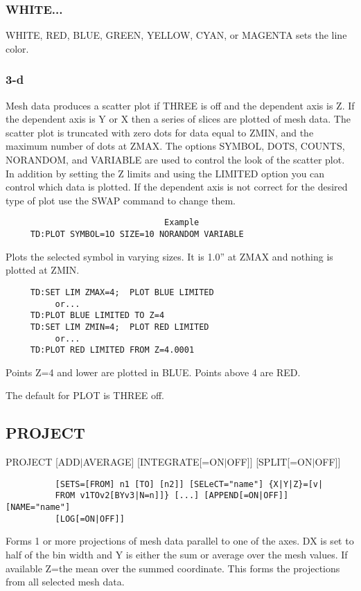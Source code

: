 \subsubsection{WHITE...}
WHITE, RED, BLUE, GREEN, YELLOW, CYAN, or MAGENTA sets the line color. 
\subsubsection{3-d}
Mesh  data  produces  a  scatter plot if THREE is off and the dependent
axis is Z.  If the dependent axis is Y or X then a series of slices are
plotted of mesh data.  The scatter plot is truncated with zero dots for
data equal to ZMIN, and the  maximum  number  of  dots  at  ZMAX.   The
options  SYMBOL,  DOTS,  COUNTS,  NORANDOM,  and  VARIABLE  are used to
control the look of the scatter plot.  In addition  by  setting  the  Z
limits  and  using  the  LIMITED  option  you can control which data is
plotted.  If the dependent axis is not correct for the desired type  of
plot use the SWAP command to change them.  

\begin{verbatim}
                                Example
     TD:PLOT SYMBOL=1O SIZE=10 NORANDOM VARIABLE 
\end{verbatim}
Plots  the  selected  symbol  in varying sizes.  It is 1.0'' at ZMAX and
nothing is plotted at ZMIN.  
\begin{verbatim}
     TD:SET LIM ZMAX=4;  PLOT BLUE LIMITED 
          or...  
     TD:PLOT BLUE LIMITED TO Z=4 
     TD:SET LIM ZMIN=4;  PLOT RED LIMITED 
          or...  
     TD:PLOT RED LIMITED FROM Z=4.0001 
\end{verbatim}
Points Z=4 and lower are plotted in BLUE.  Points above 4 are RED.  

The default for PLOT is THREE off.  
\subsection{PROJECT}
PROJECT [ADD$|$AVERAGE] [INTEGRATE[=ON$|$OFF]] [SPLIT[=ON$|$OFF]]
\begin{verbatim}
          [SETS=[FROM] n1 [TO] [n2]] [SELeCT="name"] {X|Y|Z}=[v|
          FROM v1TOv2[BYv3|N=n]]} [...] [APPEND[=ON|OFF]] [NAME="name"]
          [LOG[=ON|OFF]] 
\end{verbatim}

Forms 1 or more projections of mesh data parallel to one of the axes.  DX
is set to half of the bin width and Y is either the sum or  average  over
the  mesh  values.   If  available Z=the mean over the summed coordinate.
This forms the projections from all selected mesh data.  
